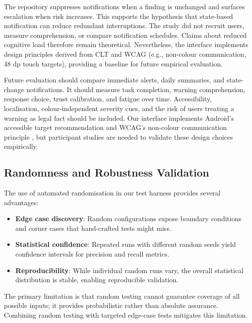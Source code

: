 The repository suppresses notifications when a finding is unchanged and surfaces escalation when risk increases. This supports the hypothesis that state-based notification can reduce redundant interruptions. The study did not recruit users, measure comprehension, or compare notification schedules. Claims about reduced cognitive load therefore remain theoretical. Nevertheless, the interface implements design principles derived from CLT and WCAG (e.g., non-colour communication, 48 dp touch targets), providing a baseline for future empirical evaluation.

Future evaluation should compare immediate alerts, daily summaries, and state-change notifications. It should measure task completion, warning comprehension, response choice, trust calibration, and fatigue over time. Accessibility, localisation, colour-independent severity cues, and the risk of users treating a warning as legal fact should be included. Our interface implements Android's accessible target recommendation and WCAG's non-colour communication principle \cite{androidaccess,wcag22}, but participant studies are needed to validate these design choices empirically.

\subsection{Randomness and Robustness Validation}

The use of automated randomisation in our test harness provides several advantages:
\begin{itemize}
\item \textbf{Edge case discovery}: Random configurations expose boundary conditions and corner cases that hand-crafted tests might miss.
\item \textbf{Statistical confidence}: Repeated runs with different random seeds yield confidence intervals for precision and recall metrics.
\item \textbf{Reproducibility}: While individual random runs vary, the overall statistical distribution is stable, enabling reproducible validation.
\end{itemize}

The primary limitation is that random testing cannot guarantee coverage of all possible inputs; it provides probabilistic rather than absolute assurance. Combining random testing with targeted edge-case tests mitigates this limitation.

